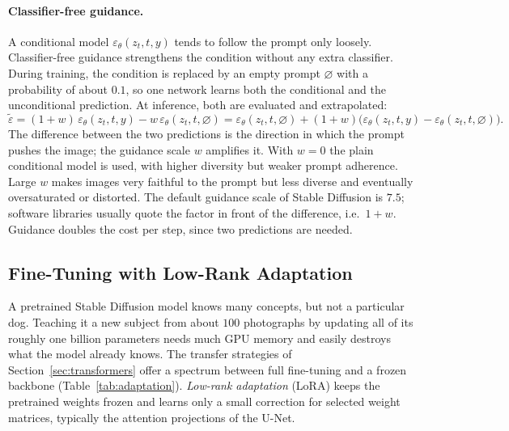 \paragraph{Classifier-free guidance.}
A conditional model $\varepsilon_\theta(z_t,t,y)$ tends to follow the prompt
only loosely. Classifier-free guidance strengthens the condition without any
extra classifier. During training, the condition is replaced by an empty
prompt $\varnothing$ with a probability of about $0.1$, so one network learns
both the conditional and the unconditional prediction. At inference, both are
evaluated and extrapolated:
\begin{equation}
  \tilde\varepsilon = (1+w)\,\varepsilon_\theta(z_t,t,y)
  - w\,\varepsilon_\theta(z_t,t,\varnothing)
  = \varepsilon_\theta(z_t,t,\varnothing)
  + (1+w)\bigl(\varepsilon_\theta(z_t,t,y)-\varepsilon_\theta(z_t,t,\varnothing)\bigr).
  \label{eq:diff-cfg}
\end{equation}
\noindent
The difference between the two predictions is the direction in which the
prompt pushes the image; the guidance scale $w$ amplifies it. With $w=0$ the
plain conditional model is used, with higher diversity but weaker prompt
adherence. Large $w$ makes images very faithful to the prompt but less diverse
and eventually oversaturated or distorted. The default guidance scale of
Stable Diffusion is $7.5$; software libraries usually quote the factor in
front of the difference, i.e.\ $1+w$. Guidance doubles the cost per step,
since two predictions are needed.

\subsection{Fine-Tuning with Low-Rank Adaptation}

A pretrained Stable Diffusion model knows many concepts, but not a particular
dog. Teaching it a new subject from about $100$ photographs by updating all of
its roughly one billion parameters needs much GPU memory and easily destroys
what the model already knows. The transfer strategies of
Section~\ref{sec:transformers} offer a spectrum between full fine-tuning and a
frozen backbone (Table~\ref{tab:adaptation}). \emph{Low-rank adaptation}
(LoRA) keeps the pretrained weights frozen and learns only a small correction
for selected weight matrices, typically the attention projections of the
U-Net.


